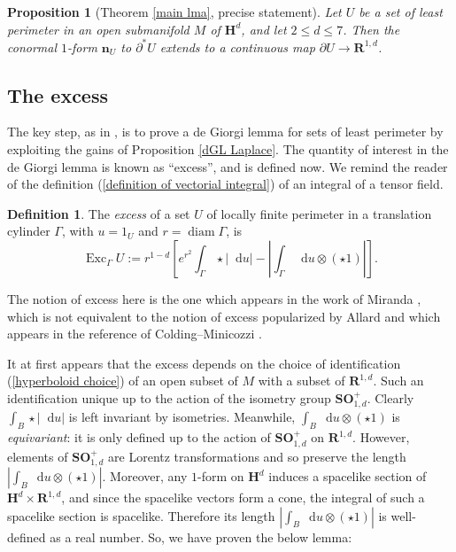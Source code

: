 \documentclass[reqno,10pt]{amsart}
\newcommand{\RR}{\mathbf{R}}
\newcommand{\Hyp}{\mathbf H}
\newcommand{\SpOrth}{\mathbf{SO}}
\DeclareMathOperator{\diam}{diam}
\DeclareMathOperator{\Exc}{Exc}
\newcommand*\dif{\mathop{}\!\mathrm{d}}
\newcommand{\normal}{\mathbf n}
\newcommand{\dfn}[1]{\emph{#1}\index{#1}}
\newtheorem{proposition}[theorem]{Proposition}
\theoremstyle{definition}
\newtheorem{definition}[theorem]{Definition}
\numberwithin{equation}{section}
\begin{document}
\begin{proposition}[Theorem \ref{main lma}, precise statement]
Let $U$ be a set of least perimeter in an open submanifold $M$ of $\Hyp^d$, and let $2 \leq d \leq 7$.
Then the conormal $1$-form $\normal_U$ to $\partial^* U$ extends to a continuous map $\partial U \to \RR^{1, d}$.
\end{proposition}


\subsection{The excess}
The key step, as in \cite{Miranda66}, is to prove a de Giorgi lemma for sets of least perimeter by exploiting the gains of Proposition \ref{dGL Laplace}.
The quantity of interest in the de Giorgi lemma is known as ``excess'', and is defined now.
We remind the reader of the definition (\ref{definition of vectorial integral}) of an integral of a tensor field.

\begin{definition}
The \dfn{excess} of a set $U$ of locally finite perimeter in a translation cylinder $\Gamma$, with $u = 1_U$ and $r = \diam \Gamma$, is
$$\Exc_\Gamma U := r^{1 - d}\left[e^{r^2}\int_\Gamma \star |\dif u| - \left|\int_\Gamma \dif u \otimes (\star 1)\right|\right].$$
\end{definition}

The notion of excess here is the one which appears in the work of Miranda \cite{Miranda66}, which is not equivalent to the notion of excess popularized by Allard \cite{Allard72} and which appears in the reference of Colding--Minicozzi \cite{colding2011course}.

It at first appears that the excess depends on the choice of identification (\ref{hyperboloid choice}) of an open subset of $M$ with a subset of $\RR^{1, d}$.
Such an identification unique up to the action of the isometry group $\SpOrth_{1, d}^+$.
Clearly $\int_B \star |\dif u|$ is left invariant by isometries.
Meanwhile, $\int_B \dif u \otimes (\star 1)$ is \emph{equivariant}: it is only defined up to the action of $\SpOrth_{1, d}^+$ on $\RR^{1, d}$.
However, elements of $\SpOrth_{1, d}^+$ are Lorentz transformations and so preserve the length $|\int_B \dif u \otimes (\star 1)|$.
Moreover, any $1$-form on $\Hyp^d$ induces a spacelike section of $\Hyp^d \times \RR^{1, d}$, and since the spacelike vectors form a cone, the integral of such a spacelike section is spacelike.
Therefore its length $|\int_B \dif u \otimes (\star 1)|$ is well-defined as a real number.
So, we have proven the below lemma:
\end{document}

